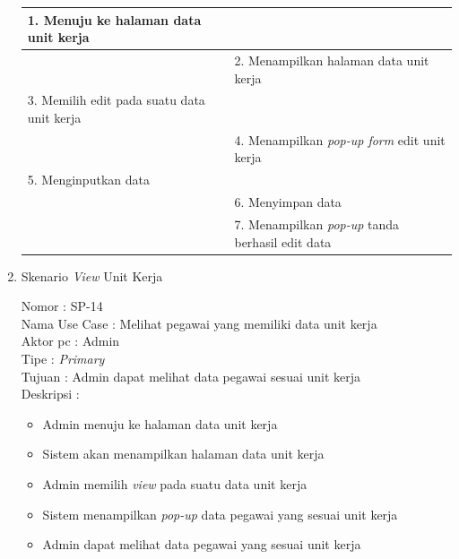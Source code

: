 \begin{enumerate}
\begin{table}
\begin{tabular}{ | p{58mm} | p{70mm} |}
		1.	Menuju ke halaman data unit kerja &  \\
		
		\hline
		
		&  2.	Menampilkan halaman data unit kerja \\
		
		\hline
		
		3. Memilih edit pada suatu data unit kerja & \\
		
		\hline
		
		& 4.	Menampilkan \textit{pop-up form}  edit unit kerja \\
		
		\hline
		
		5.	Menginputkan data  & \\
		\hline
		
		& 6.	Menyimpan data \\
		\hline
		
		& 7.	Menampilkan \textit{pop-up }tanda berhasil edit data \\
		\hline
		
	\end{tabular}
\end{table}

\newpage
\item Skenario \textit{View} Unit Kerja

Nomor \kern 3.6pc : SP-14 \\
Nama Use Case : Melihat pegawai yang memiliki data unit kerja \\
Aktor  pc : Admin \\
Tipe \kern 4.6pc : \textit{Primary} \\
Tujuan \kern 3.6pc : Admin dapat melihat data pegawai sesuai unit kerja \\
Deskripsi \kern 2.5pc : 

\begin{itemize}
	\item Admin menuju ke halaman data unit kerja
	\item Sistem akan menampilkan halaman data unit kerja
	\item Admin memilih \textit{view} pada suatu data unit kerja
	\item Sistem menampilkan\textit{ pop-up} data pegawai yang sesuai unit kerja
	\item Admin dapat melihat data pegawai yang sesuai unit kerja
	
\end{itemize}


\end{enumerate}
